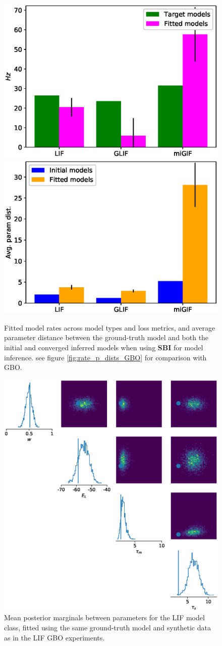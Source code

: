 \documentclass[mphil,deptreport,ianc]{infthesis} %
\begin{document}
\begin{figure}
    \centering
	\includegraphics[width=0.49\columnwidth]{figures/sbi_plot_rates_all.eps}
	\includegraphics[width=0.49\columnwidth]{figures/sbi_mean_p_dist_all.eps}
	\caption{Fitted model rates across model types and loss metrics, and average parameter distance between the ground-truth model and both the initial and converged inferred models when using \textbf{SBI} for model inference. see figure \ref{fig:rate_p_dists_GBO} for comparison with GBO.}
	\label{fig:rate_p_dists_SBI}
\end{figure}


\begin{figure}
    \centering
	\includegraphics[width=0.5\columnwidth]{figures/sbi_p_avgs_pairplot_SNPE_LIF_12-15_04-56-19-338.eps}
	\caption{Mean posterior marginals between parameters for the LIF model class, fitted using the same ground-truth model and synthetic data as in the LIF GBO experiments.}
	\label{fig:mean_posterior_marginal_SNPE_LIF}
\end{figure}
\end{document}
